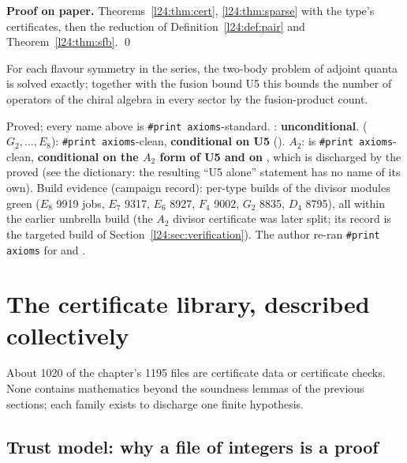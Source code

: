 \textbf{Proof on paper.} Theorems~\ref{l24:thm:cert}, \ref{l24:thm:sparse} with the type's certificates, then the
reduction of Definition~\ref{l24:def:pair} and Theorem~\ref{l24:thm:sfb}. \qed

\begin{physics}
For each flavour symmetry in the series, the two-body problem of adjoint quanta is solved exactly; together with
the fusion bound U5 this bounds the number of operators of the chiral algebra in every sector by the fusion-product
count.
\end{physics}

\begin{status}
Proved; every name above is \texttt{\#print axioms}-standard. : \textbf{unconditional}.
 ($G_2,\dots,E_8$): \texttt{\#print axioms}-clean, \textbf{conditional on U5}
(). $A_2$:  is \texttt{\#print axioms}-clean,
\textbf{conditional on the $A_2$ form of U5 and on} , which is discharged by the proved
 (see the dictionary: the resulting ``U5 alone'' statement has no name of its own). Build
evidence (campaign record): per-type builds of the divisor modules green ($E_8$ 9919 jobs, $E_7$ 9317, $E_6$ 8927, $F_4$ 9002,
$G_2$ 8835, $D_4$ 8795), all within the earlier umbrella build (the $A_2$ divisor certificate was later split; its record is the
targeted build of Section~\ref{l24:sec:verification}). The author re-ran \texttt{\#print axioms} for  and
.
\end{status}

\section{The certificate library, described collectively}\label{l24:sec:certs}

About 1020 of the chapter's 1195 files are certificate data or certificate checks. None contains mathematics beyond
the soundness lemmas of the previous sections; each family exists to discharge one finite hypothesis.

\subsection{Trust model: why a file of integers is a proof}\label{l24:sec:trust}

